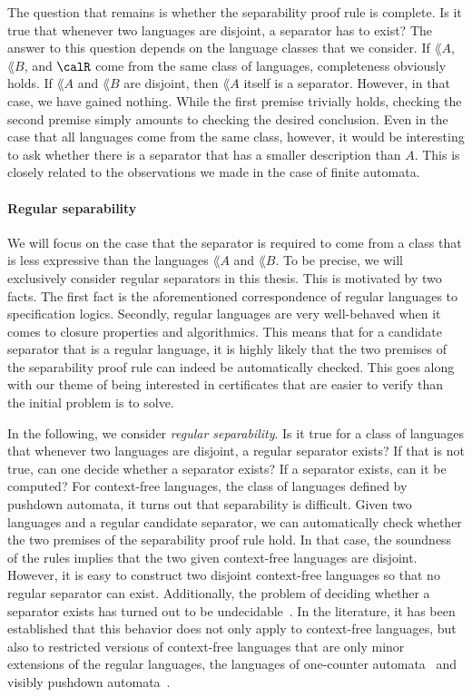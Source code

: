 \documentclass[../../diss.tex]{subfiles}
\begin{document}
The question that remains is whether the separability proof rule is complete.
Is it true that whenever two languages are disjoint, a separator has to exist?
The answer to this question depends on the language classes that we consider.
If $\lang{A}$, $\lang{B}$, and $\calR$ come from the same class of languages, completeness obviously holds.
If $\lang{A}$ and $\lang{B}$ are disjoint, then $\lang{A}$ itself is a separator.
However, in that case, we have gained nothing.
While the first premise trivially holds, checking the second premise simply amounts to checking the desired conclusion.
Even in the case that all languages come from the same class, however, it would be interesting to ask whether there is a separator that has a smaller description than $A$.
This is closely related to the observations we made in the case of finite automata.

\paragraph{Regular separability}

We will focus on the case that the separator is required to come from a class that is less expressive than the languages $\lang{A}$ and $\lang{B}$.
To be precise, we will exclusively consider regular separators in this thesis.
This is motivated by two facts.
The first fact is the aforementioned correspondence of regular languages to specification logics.
Secondly, regular languages are very well-behaved when it comes to closure properties and algorithmics.
This means that for a candidate separator that is a regular language, it is highly likely that the two premises of the separability proof rule can indeed be automatically checked.
This goes along with our theme of being interested in certificates that are easier to verify than the initial problem is to solve.

In the following, we consider \emph{regular separability}.
Is it true for a class of languages that whenever two languages are disjoint, a regular separator exists?
If that is not true, can one decide whether a separator exists?
If a separator exists, can it be computed?
For context-free languages, the class of languages defined by pushdown automata, it turns out that separability is difficult.
Given two languages and a regular candidate separator, we can automatically check whether the two premises of the separability proof rule hold.
In that case, the soundness of the rules implies that the two given context-free languages are disjoint.
However, it is easy to construct two disjoint context-free languages so that no regular separator can exist.
Additionally, the problem of deciding whether a separator exists has turned out to be undecidable~\cite{SzymanskiW76}.
In the literature, it has been established that this behavior does not only apply to context-free languages, but also to restricted versions of context-free languages that are only minor extensions of the regular languages, \eg the languages of one-counter automata~\cite{CzerwinskiL17} and visibly pushdown automata~\cite{Kopczynski16}.
\end{document}
